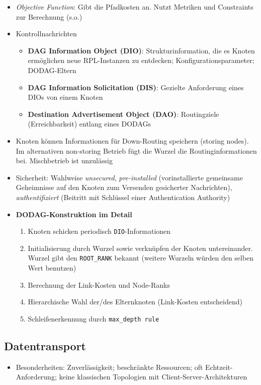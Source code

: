 \begin{itemize}
\begin{itemize}
		\item \textit{Objective Function}: Gibt die Pfadkosten an. Nutzt Metriken und Constraints zur Berechnung (s.o.)
		\item Kontrollnachrichten
		\begin{itemize}
			\item \textbf{DAG Information Object (DIO)}: Strukturinformation, die es Knoten ermöglichen neue RPL-Instanzen zu entdecken; Konfigurationsparameter; DODAG-Eltern
			\item \textbf{DAG Information Solicitation (DIS)}: Gezielte Anforderung eines DIOs von einem Knoten
			\item \textbf{Destination Advertisement Object (DAO)}: Routingziele (Erreichbarkeit) entlang eines DODAGs
		\end{itemize}
		\item Knoten können Informationen für Down-Routing speichern (storing nodes). Im alternativen non-storing Betrieb fügt die Wurzel die Routinginformationen bei. Mischbetrieb ist unzulässig
		\item Sicherheit: Wahlweise \textit{unsecured}, \textit{pre-installed} (vorinstallierte gemeinsame Geheimnisse auf den Knoten zum Versenden gesicherter Nachrichten), \textit{authentifiziert} (Beitritt mit Schlüssel einer Authentication Authority)
		\item \textbf{DODAG-Konstruktion im Detail}
		\begin{enumerate}
			\item Knoten schicken periodisch \texttt{DIO}-Informationen
			\item Initialisierung durch Wurzel sowie verknüpfen der Knoten untereinander. Wurzel gibt den \texttt{ROOT\_RANK} bekannt (weitere Wurzeln würden den selben Wert benutzen)
			\item Berechnung der Link-Kosten und Node-Ranks
			\item Hierarchische Wahl der/des Elternknoten (Link-Kosten entscheidend)
			\item Schleifenerkennung durch \texttt{max\_depth rule}
		\end{enumerate}
	\end{itemize}
\end{itemize}


\subsection{Datentransport}
\begin{itemize}
	\item Besonderheiten: Zuverlässigkeit; beschränkte Ressourcen; oft Echtzeit-Anforderung; keine klassischen Topologien mit Client-Server-Architekturen
\end{itemize}

